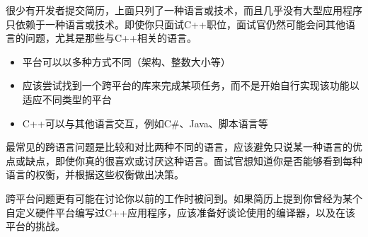 
很少有开发者提交简历，上面只列了一种语言或技术，而且几乎没有大型应用程序只依赖于一种语言或技术。即使你只面试C++职位，面试官仍然可能会问其他语言的问题，尤其是那些与C++相关的语言。


\begin{itemize}
\item
平台可以以多种方式不同（架构、整数大小等）

\item
应该尝试找到一个跨平台的库来完成某项任务，而不是开始自行实现该功能以适应不同类型的平台

\item
C++可以与其他语言交互，例如C\#、Java、脚本语言等
\end{itemize}


最常见的跨语言问题是比较和对比两种不同的语言，应该避免只说某一种语言的优点或缺点，即使你真的很喜欢或讨厌这种语言。面试官想知道你是否能够看到每种语言的权衡，并根据这些权衡做出决策。

跨平台问题更有可能在讨论你以前的工作时被问到。如果简历上提到你曾经为某个自定义硬件平台编写过C++应用程序，应该准备好谈论使用的编译器，以及在该平台的挑战。






